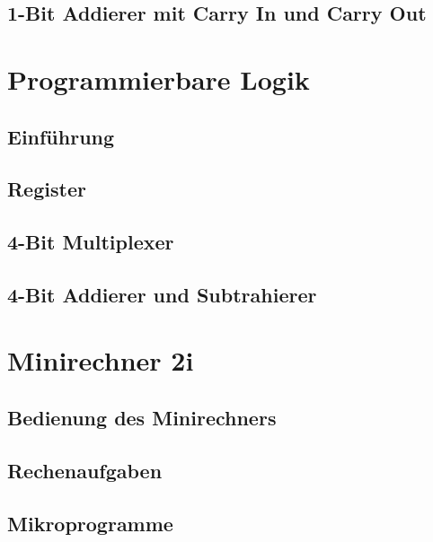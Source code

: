 \documentclass[paper=a4, fontsize=11pt]{scrartcl}
\numberwithin{equation}{section}
\numberwithin{figure}{section}
\numberwithin{table}{section}
\begin{document}
\subsection{1-Bit Addierer mit Carry In und Carry Out}


\newpage

\section{Programmierbare Logik}

\subsection{Einführung}

\subsection{Register}

\subsection{4-Bit Multiplexer}

\subsection{4-Bit Addierer und Subtrahierer}


\newpage

\section{Minirechner 2i}

\subsection{Bedienung des Minirechners}

\subsection{Rechenaufgaben}

\subsection{Mikroprogramme}
\end{document}
